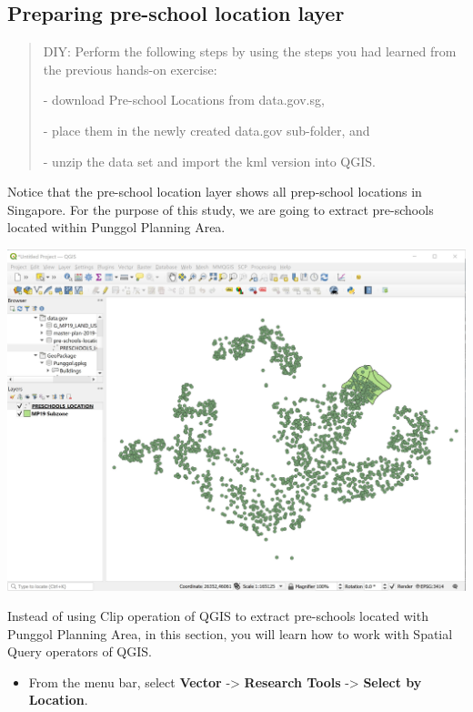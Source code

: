 \documentclass[
  letterpaper,
  DIV=11,
  numbers=noendperiod]{scrreprt}
\providecommand{\tightlist}{%
  \setlength{\itemsep}{0pt}\setlength{\parskip}{0pt}}\usepackage{longtable,booktabs,array}
\begin{document}
\hypertarget{preparing-pre-school-location-layer}{%
\subsection{Preparing pre-school location
layer}\label{preparing-pre-school-location-layer}}

\begin{quote}
DIY: Perform the following steps by using the steps you had learned from
the previous hands-on exercise:

- download Pre-school Locations from data.gov.sg,

- place them in the newly created data.gov sub-folder, and

- unzip the data set and import the kml version into QGIS.
\end{quote}

Notice that the pre-school location layer shows all prep-school
locations in Singapore. For the purpose of this study, we are going to
extract pre-schools located within Punggol Planning Area.

\includegraphics[width=9.09375in,height=\textheight]{./img04/image92.jpg}

Instead of using Clip operation of QGIS to extract pre-schools located
with Punggol Planning Area, in this section, you will learn how to work
with Spatial Query operators of QGIS.

\begin{itemize}
\tightlist
\item
  From the menu bar, select \textbf{Vector} -\textgreater{}
  \textbf{Research Tools} -\textgreater{} \textbf{Select by Location}.
\end{itemize}
\end{document}
